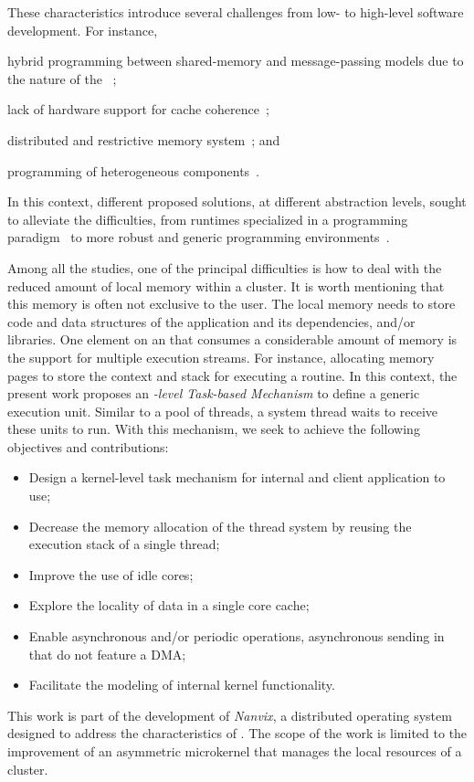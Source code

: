 	These characteristics introduce several challenges from low- to high-level
	software development. For instance,
	\begin{enumerate*}[label=(\roman*)]
		\item hybrid programming between shared-memory and message-passing
			models due to the nature of the \lws~\cite{kelly2013};
		\item lack of hardware support for cache coherence~\cite{francesquini2015};
		\item distributed and restrictive memory system~\cite{Castro2016}; and
		\item programming of heterogeneous components~\cite{Barbalace2015}.
	\end{enumerate*}
	In this context, different proposed solutions, at different abstraction
	levels, sought to alleviate the difficulties, from runtimes specialized in
	a programming paradigm~\cite{Zhou:coroutine, Cesarini:task} to more robust
	and generic programming environments~\cite{Penna:Microkernel}.

	Among all the studies, one of the principal difficulties is how to deal
	with the reduced amount of local memory within a cluster. It is worth
	mentioning that this memory is often not exclusive to the user. The local
	memory needs to store code and data structures of the application and its
	dependencies, \eg \os and/or libraries. One element on an \os that consumes
	a considerable amount of memory is the support for multiple execution
	streams. For instance, allocating memory pages to store the context and
	stack for executing a routine.
	In this context, the present work proposes an \textit{\os-level Task-based
	Mechanism} to define a generic execution unit.  Similar to a pool of
	threads, a system thread waits to receive these units to run.
	With this mechanism, we seek to achieve the following objectives
	and contributions:
	\begin{itemize}
		\item Design a kernel-level task mechanism for internal \os and client
			application to use;
		\item Decrease the memory allocation of the thread system by reusing
			the execution stack of a single thread;
		\item Improve the use of idle cores;
		\item Explore the locality of data in a single core cache;
		\item Enable asynchronous and/or periodic operations, \eg
			asynchronous sending in \lws that do not feature a DMA;
		\item Facilitate the modeling of internal kernel functionality.
	\end{itemize}
	This work is part of the development of \textit{Nanvix}, a distributed
	operating system designed to address the characteristics of \lws. The scope
	of the work is limited to the improvement of an asymmetric microkernel that
	manages the local resources of a cluster.

